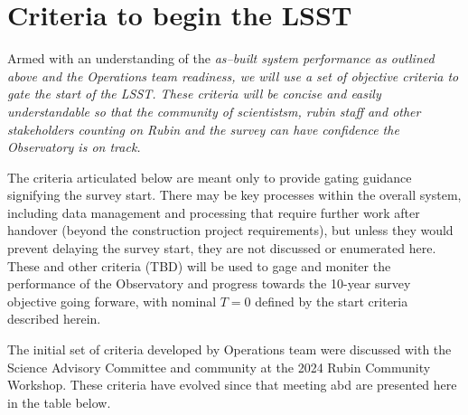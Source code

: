 \section{Criteria to begin the LSST}

Armed with an understanding of the \it{as--built} system performance as outlined above and the Operations team readiness, we will use a set of objective criteria to gate the start of the LSST. These criteria will be concise and easily understandable so that the community of scientistsm, rubin staff and other stakeholders counting on Rubin and the survey can have confidence the Observatory is on track.

The criteria articulated below are meant only to provide gating guidance signifying the survey start. There may be key processes within the overall system, including data management and processing that require further work after handover (beyond the construction project requirements), but unless they would prevent delaying the survey start, they are not discussed or enumerated here.  These and other criteria (TBD) will be used to gage and moniter the performance of the Observatory and progress towards the 10-year survey objective going forware, with nominal $T=0$ defined by the start criteria described herein.

The initial set of criteria developed by Operations team were discussed with the Science Advisory Committee and community at the 2024 Rubin Community Workshop. These criteria have evolved since that meeting abd are presented here in the table below.


